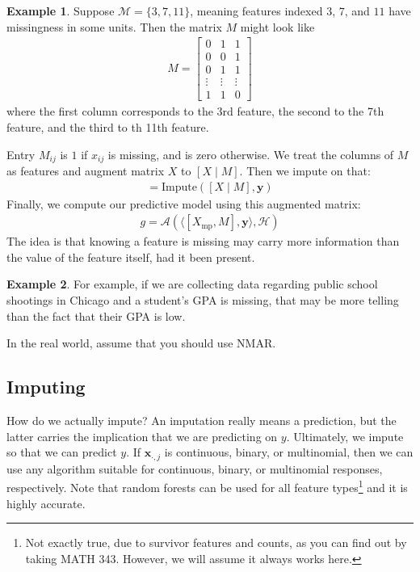\documentclass[12pt, a4paper]{article}
\theoremstyle{definition}
\newtheorem*{example}{Example}
\begin{document}
	\begin{tcolorbox}
		\begin{example}
			Suppose $\mathcal{M} = \{3, 7, 11\}$, meaning features indexed $3$, $7$,
			and $11$ have missingness in some units. Then the matrix $M$ might look like
			\begin{align*}
				M = \begin{bmatrix}
					0 & 1 & 1\\
					0 & 0 & 1\\
					0 & 1 & 1\\
					\vdots & \vdots & \vdots\\
					1 & 1 & 0
				\end{bmatrix}
			\end{align*}
			where the first column corresponds to the 3rd feature, the
			second to the 7th feature, and the third to th 11th feature.
		\end{example}
	\end{tcolorbox}
	Entry $M_{ij}$ is $1$ if $x_{ij}$ is missing, and is zero otherwise.
	We treat the columns of $M$ as features and augment matrix $X$
	to $[X \mid M]$. Then we impute on that:
	\begin{align*}
		[X_{\text{imp}} \mid M] = \text{Impute}([X\mid M], \bm{y})
	\end{align*}
	Finally, we compute our predictive model using this augmented matrix:
	\begin{align*}
		g = \mathcal{A}(\langle [X_{\text{mp}}, M], \bm{y}\rangle, \mathcal{H})
	\end{align*}
	The idea is that knowing a feature is missing may carry more information
	than the value of the feature itself, had it been present.
	\begin{tcolorbox}
		\begin{example}
			 For example,
			if we are collecting data regarding public school shootings in Chicago
			and a student's GPA is missing, that may be more telling than the
			fact that their GPA is low.
		\end{example}
	\end{tcolorbox}
	In the real world, assume that you should use NMAR.
	\subsection{Imputing}
	How do we actually impute? An imputation really means a prediction,
	but the latter carries the implication that we are predicting on $y$.
	Ultimately, we impute so that we can predict $y$. If $\bm{x}_{\cdot, j}$
	is continuous, binary, or multinomial, then we can use any algorithm
	suitable for continuous, binary, or multinomial responses, respectively.
	Note that random forests can be used for all feature
	types\footnote{Not exactly true, due to survivor features and counts, as you can find
		out by taking MATH 343. However, we will assume it always works here.
	}
	and it is highly accurate.
	
\end{document}
